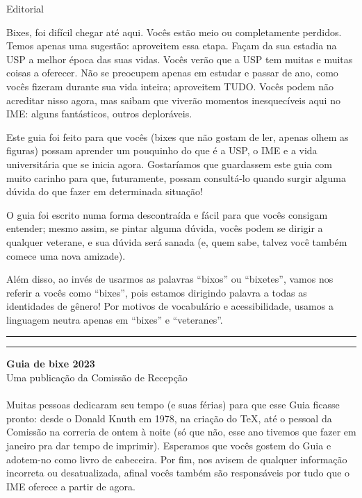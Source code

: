 \begin{editorial}{Editorial}

Bixes, foi difícil chegar até aqui. Vocês
estão meio ou completamente perdidos. Temos apenas uma sugestão: aproveitem essa
etapa. Façam da sua estadia na USP a melhor época das suas vidas. Vocês verão
que a USP tem muitas e muitas coisas a oferecer. Não se preocupem apenas em
estudar e passar de ano, como vocês fizeram durante sua vida inteira; aproveitem
TUDO. Vocês podem não acreditar nisso agora, mas saibam que viverão momentos
inesquecíveis aqui no IME: alguns fantásticos, outros deploráveis.

Este guia foi feito para que vocês (bixes que não gostam de ler, apenas olhem as figuras)
possam aprender um pouquinho do que é a USP,
o IME e a vida universitária que se inicia agora. 
Gostaríamos que guardassem este guia com muito carinho para que, futuramente, possam consultá-lo
quando surgir alguma dúvida do que fazer em determinada situação!

O guia foi escrito numa forma
descontraída e fácil para que vocês consigam entender; mesmo assim, se pintar
alguma dúvida, vocês podem se dirigir a qualquer veterane, e sua dúvida será
sanada (e, quem sabe, talvez você também comece uma nova amizade).

Além disso, ao invés de usarmos as palavras ``bixos'' ou ``bixetes'', vamos nos referir
a vocês como ``bixes'', pois estamos dirigindo palavra a todas as identidades de 
gênero! Por motivos de vocabulário e acessibilidade, usamos a linguagem neutra 
apenas em ``bixes'' e ``veteranes''.


\rule{\textwidth}{0.5ex}\rule{2ex}{0.5ex}

{\large\bf Guia de bixe 2023} \\
Uma publicação da Comissão de Recepção

\paragraph{}
Muitas pessoas dedicaram seu tempo (e suas férias) para que esse Guia ficasse
pronto: desde o Donald Knuth em 1978, na criação do \TeX\makebox{}, até o
pessoal da Comissão na correria de ontem à noite (só que não, esse ano tivemos que 
fazer em janeiro pra dar tempo de imprimir). Esperamos que vocês gostem do Guia
e adotem-no como livro de cabeceira. Por fim, nos avisem de qualquer informação
incorreta ou desatualizada, afinal vocês também são responsáveis por tudo que o
IME oferece a partir de agora.


\end{editorial}
